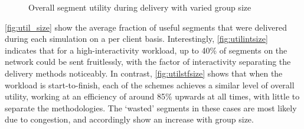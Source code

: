\begin{figure}[t]
    \centering

    \caption{Overall segment utility during delivery with varied group size}
    \label{fig:util_size}
\end{figure}


\autoref{fig:util_size} show the average fraction of useful segments that were delivered during each simulation on a per client basis. Interestingly, \autoref{fig:utilintsize} indicates that for a high-interactivity workload, up to 40\% of segments on the network could be sent fruitlessly, with the factor of interactivity separating the delivery methods noticeably. In contrast, \autoref{fig:utilstfsize} shows that when the workload is start-to-finish, each of the schemes achieves a similar level of overall utility, working at an efficiency of around 85\% upwards at all times, with little to separate the methodologies. The `wasted' segments in these cases are most likely due to congestion, and accordingly show an increase with group size.

